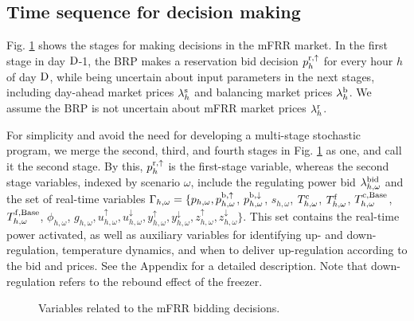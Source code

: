 \documentclass[11pt,a4paper]{article}
\begin{document}
\subsection{Time sequence for decision making}
Fig. \ref{fig:timeline_mfrr_variables} shows the stages for making decisions in the mFRR market. In the first stage in day $\rm{D}$-1, the BRP makes a reservation bid decision $p_{h}^{\rm{r},\uparrow}$ for every hour $h$ of day $\rm{D}$,  while being uncertain about input parameters in the next stages, including day-ahead market prices $ \lambda_{h}^{\rm{s}}$  and balancing market prices $ \lambda_{h}^{\rm{b}}$. We assume the BRP is not uncertain about mFRR market prices $ \lambda_{h}^{\rm{r}}$.

For simplicity and avoid the need for developing a multi-stage stochastic program, we merge the second, third, and fourth stages in Fig. \ref{fig:timeline_mfrr_variables} as one, and call it the second stage. By this, $p_{h}^{\rm{r},\uparrow}$ is the first-stage variable, whereas the second stage variables, indexed by scenario $\omega$, include
the regulating power bid $\lambda_{h,\omega}^{\rm{bid}}$ and the set of real-time variables $\Gamma_{h,\omega} = \{ p_{h,\omega}, p_{h,\omega}^{\rm{b},\uparrow}$, $p_{h,\omega}^{\rm{b},\downarrow}$, $s_{h,\omega}$, $T_{h,\omega}^{\rm{c}}$, $T_{h,\omega}^{\rm{f}}$, $T_{h,\omega}^{\rm{c,\text{Base}}}$, $T_{h,\omega}^{\rm{f,\text{Base}}}$, $\phi_{h,\omega}$, $g_{h,\omega}, u^{\uparrow}_{h,\omega}, u^{\downarrow}_{h,\omega}, y^{\uparrow}_{h,\omega}, y^{\downarrow}_{h,\omega}, z^{\uparrow}_{h,\omega}, z^{\downarrow}_{h,\omega} \}$. This set contains the real-time power activated, as well as auxiliary variables for identifying up- and down-regulation,  temperature dynamics, and when to deliver up-regulation according to the bid and prices. See the Appendix for a detailed description. Note that down-regulation refers to the rebound effect of the freezer.

\begin{figure}[b]
    \centering
    
    \caption{Variables related to the mFRR  bidding decisions.}
    \label{fig:timeline_mfrr_variables}
\end{figure}
\end{document}
